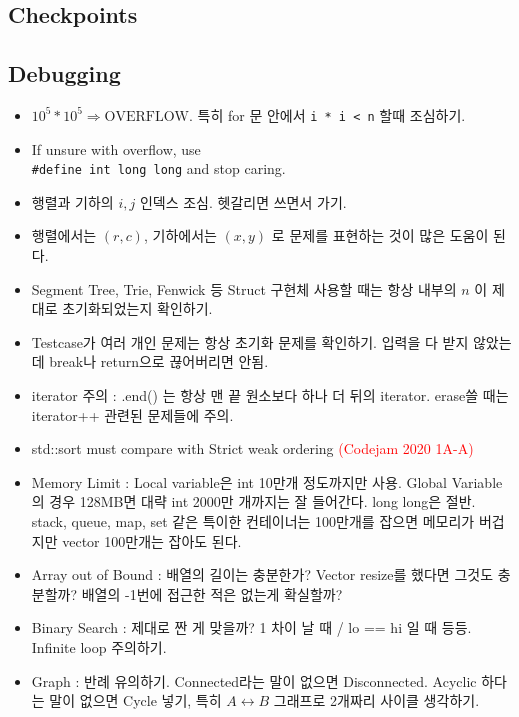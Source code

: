 \documentclass[9pt, a4paper, notitlepage]{extreport}
\begin{document}
	\begin{multicols*}{2}
	\chapter{Checkpoints}
	\section{Debugging}
	\begin{itemize}
	  \item $10^5 * 10^5 \Rightarrow \text{OVERFLOW}$. 특히 for 문 안에서 \texttt{i * i < n} 할때 조심하기.
	  \item If unsure with overflow, use \\
	  \texttt{\#define int long long} and stop caring.
	  \item 행렬과 기하의 $i, j$ 인덱스 조심. 헷갈리면 쓰면서 가기.
	  \item 행렬에서는 $(r, c)$, 기하에서는 $(x, y)$ 로 문제를 표현하는 것이 많은 도움이 된다.
	  \item Segment Tree, Trie, Fenwick 등 Struct 구현체 사용할 때는 항상 내부의 $n$ 이 제대로 초기화되었는지 확인하기.
	  \item Testcase가 여러 개인 문제는 항상 초기화 문제를 확인하기. 입력을 다 받지 않았는데 break나 return으로 끊어버리면 안됨.
	  \item iterator 주의 : .end() 는 항상 맨 끝 원소보다 하나 더 뒤의 iterator. erase쓸 때는 iterator++ 관련된 문제들에 주의.
	  \item std::sort must compare with Strict weak ordering \textcolor{red}{(Codejam 2020 1A-A)}
	  \item Memory Limit : Local variable은 int 10만개 정도까지만 사용. Global Variable의 경우 128MB면 대략 int 2000만 개까지는 잘 들어간다. long long은 절반. stack, queue, map, set 같은 특이한 컨테이너는 100만개를 잡으면 메모리가 버겁지만 vector 100만개는 잡아도 된다.
	  \item Array out of Bound : 배열의 길이는 충분한가? Vector resize를 했다면 그것도 충분할까? 배열의 -1번에 접근한 적은 없는게 확실할까?
	  \item Binary Search : 제대로 짠 게 맞을까? 1 차이 날 때 / lo == hi 일 때 등등. Infinite loop 주의하기.
	  \item Graph : 반례 유의하기. Connected라는 말이 없으면 Disconnected. Acyclic 하다는 말이 없으면 Cycle 넣기, 특히 $A \leftrightarrow B$ 그래프로 2개짜리 사이클 생각하기.
	\end{itemize}

\end{multicols*}
\end{document}
